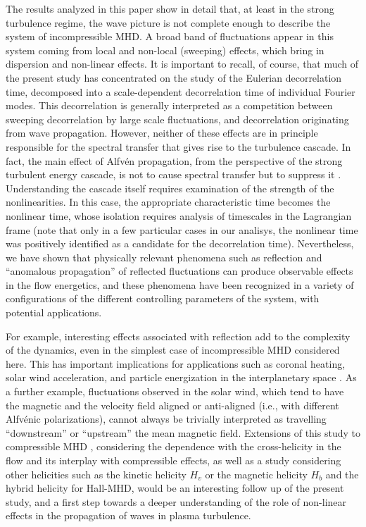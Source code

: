 \documentclass[aip,pop,reprint,amsmath,amssymb,floatfix]{revtex4-1}
\begin{document}
The results analyzed in this paper show in detail that, at least in
the strong turbulence regime, the wave picture is not complete enough
to describe the system of incompressible MHD. A broad band of
fluctuations appear in this system coming from local and non-local
(sweeping) effects, which bring in dispersion and non-linear
effects. It is important to recall, of course, that much of the
present study has concentrated on the study of the Eulerian decorrelation 
time, decomposed into a scale-dependent decorrelation time of individual 
Fourier modes. This decorrelation is generally interpreted as a 
competition between sweeping decorrelation by large scale fluctuations, 
and decorrelation originating from wave propagation. However, neither 
of these effects are in principle responsible for the spectral transfer
that gives rise to the turbulence cascade. In fact, the main effect of 
Alfv\'en propagation, from the perspective of the strong turbulent 
energy cascade,  is not to cause spectral transfer but to suppress it 
\cite{shebalin_1983_anisotropy}.  Understanding the cascade itself
requires examination of the strength of the nonlinearities. In this case, 
the appropriate characteristic time becomes the nonlinear time, whose 
isolation requires analysis of timescales in the Lagrangian frame
\cite{kraichnan_1964_kolmogorov} (note that only in a few particular cases 
in our analisys, the nonlinear time was positively identified as a 
candidate for the decorrelation time). Nevertheless, we have shown that 
physically relevant phenomena such as reflection and ``anomalous
propagation'' of reflected fluctuations can produce observable
effects in the flow energetics, and these phenomena have been recognized
in a variety of configurations of the different controlling parameters 
of the system, with potential applications.

For example, interesting effects associated with reflection add to the
complexity of the dynamics, even in the simplest case of
incompressible MHD considered here. This has important implications
for applications such as coronal heating, solar wind acceleration, and
particle energization in the interplanetary space
\cite{velli_1993_propagation, matthaeus_1999_coronal}. As a further example,
fluctuations observed in the solar wind, which tend to have the
magnetic and the velocity field aligned or anti-aligned (i.e., with
different Alfv\'enic polarizations), cannot always be trivially
interpreted as travelling ``downstream'' or ``upstream'' the mean
magnetic field. Extensions of this study to compressible MHD
\cite{andres_2017_interplay}, considering the dependence with the
cross-helicity in the flow and its interplay with compressible
effects, as well as a study considering other helicities such as 
the kinetic helicity $H_v$ or the magnetic helicity $H_b$ and the 
hybrid helicity for Hall-MHD, would be an
interesting follow up of the present study, and a
first step towards a deeper understanding of the role of non-linear
effects in the propagation of waves in plasma turbulence. 
\end{document}
